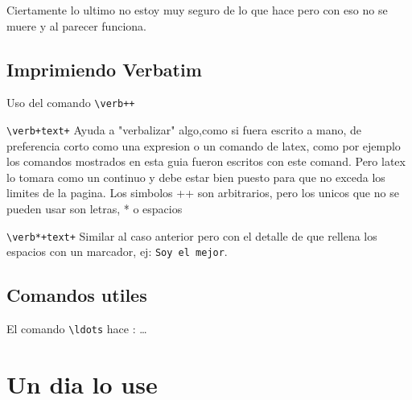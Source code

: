 \documentclass[letter,10pt]{article}
\begin{document}
Ciertamente lo ultimo no estoy muy seguro de lo que hace pero con eso no se muere y al parecer funciona.
\subsection{Imprimiendo Verbatim}
 
Uso del comando \verb|\verb++|
\begin{description}
\item{\verb|\verb+text+| } Ayuda a "verbalizar" algo,como si fuera escrito a mano, de preferencia corto como una expresion o un comando de latex, como por ejemplo los comandos mostrados en esta guia fueron escritos con este comand. Pero latex lo tomara como un continuo y debe estar bien puesto para que no exceda los limites de la pagina. Los simbolos ++ son arbitrarios, pero los unicos que no se pueden usar son letras, * o espacios
\item{\verb|\verb*+text+| } Similar al caso anterior pero con el detalle de que rellena los espacios con un marcador, ej: \verb*+Soy el mejor+.
\end{description}


\subsection{Comandos utiles}
El comando \verb|\ldots| hace :  \ldots



\section{Un dia lo use}
\end{document}
